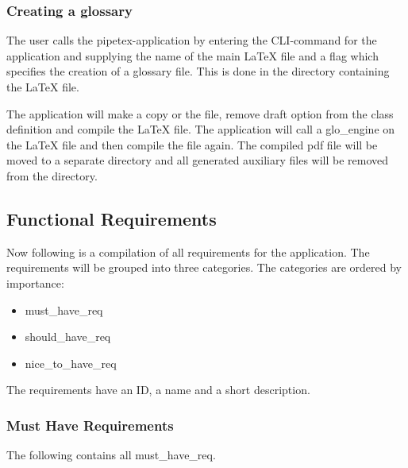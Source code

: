 \subsubsection*{Creating a glossary}
The user calls the pipetex-application by entering the CLI-command for the
application and supplying the name of the main {\LaTeX} file and a flag which
specifies the creation of a glossary file.  This is done in the directory
containing the {\LaTeX} file.

The application will make a copy or the file, remove draft option from the
class definition and compile the {\LaTeX} file. The application will call a
\gls{glo_engine} on the {\LaTeX} file and then compile the file again. The
compiled pdf file will be moved to a separate directory and all generated
auxiliary files will be removed from the directory.

\subsection{Functional Requirements}\label{sec:func_requirements}
Now following is a compilation of all requirements for the application.  The
requirements will be grouped into three categories.  The categories are ordered
by importance:

\begin{itemize}
    \item \Gls{must_have_req}
    \item \Gls{should_have_req}
    \item \Gls{nice_to_have_req}
\end{itemize}

The requirements have an ID, a name and a short description.

\newpage
\subsubsection{Must Have Requirements}\label{sec:must_have_requirements}
The following contains all \Gls{must_have_req}. 

